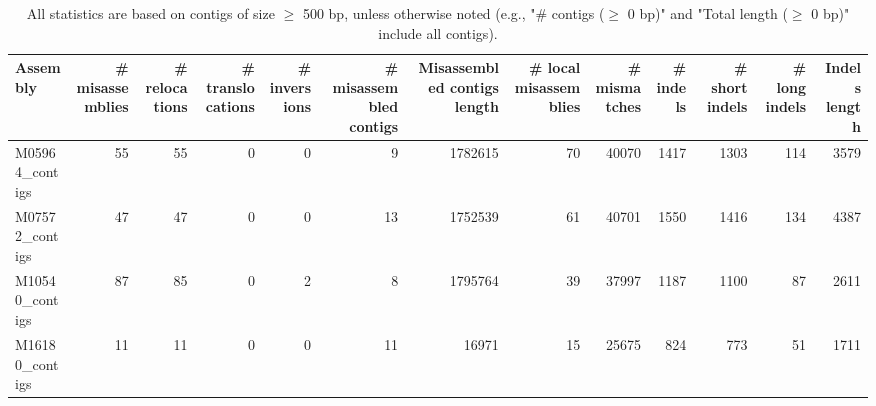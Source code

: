 \documentclass[12pt,a4paper]{article}
\begin{document}
\begin{table}[ht]
\begin{center}
\caption{All statistics are based on contigs of size $\geq$ 500 bp, unless otherwise noted (e.g., "\# contigs ($\geq$ 0 bp)" and "Total length ($\geq$ 0 bp)" include all contigs).}
\begin{tabular}{|l*{12}{|r}|}
\hline
Assembly & \# misassemblies &     \# relocations &     \# translocations &     \# inversions & \# misassembled contigs & Misassembled contigs length & \# local misassemblies & \# mismatches & \# indels &     \# short indels &     \# long indels & Indels length \\ \hline
M05964\_contigs & 55 & 55 & 0 & 0 & 9 & 1782615 & 70 & 40070 & 1417 & 1303 & 114 & 3579 \\ \hline
M07572\_contigs & 47 & 47 & 0 & 0 & 13 & 1752539 & 61 & 40701 & 1550 & 1416 & 134 & 4387 \\ \hline
M10540\_contigs & 87 & 85 & 0 & 2 & 8 & 1795764 & 39 & 37997 & 1187 & 1100 & 87 & 2611 \\ \hline
M16180\_contigs & 11 & 11 & 0 & 0 & 11 & 16971 & 15 & 25675 & 824 & 773 & 51 & 1711 \\ \hline
\end{tabular}
\end{center}
\end{table}
\end{document}
